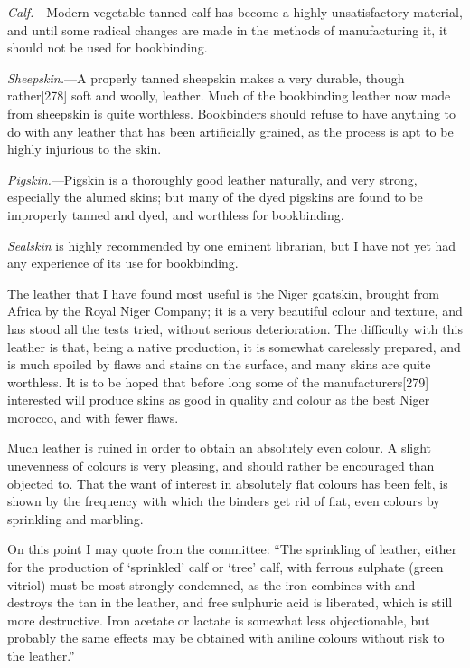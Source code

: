 \documentclass[
]{article}
\begin{document}
\emph{Calf.}---Modern vegetable-tanned calf has become a highly
unsatisfactory material, and until some radical changes are made in the
methods of manufacturing it, it should not be used for bookbinding.

\emph{Sheepskin.}---A properly tanned sheepskin makes a very durable,
though rather{\protect\hypertarget{Page_278}{}{{[}278{]}}} soft and
woolly, leather. Much of the bookbinding leather now made from sheepskin
is quite worthless. Bookbinders should refuse to have anything to do
with any leather that has been artificially grained, as the process is
apt to be highly injurious to the skin.

\emph{Pigskin.}---Pigskin is a thoroughly good leather naturally, and
very strong, especially the alumed skins; but many of the dyed pigskins
are found to be improperly tanned and dyed, and worthless for
bookbinding.

\emph{Sealskin} is highly recommended by one eminent librarian, but I
have not yet had any experience of its use for bookbinding.

The leather that I have found most useful is the Niger goatskin, brought
from Africa by the Royal Niger Company; it is a very beautiful colour
and texture, and has stood all the tests tried, without serious
deterioration. The difficulty with this leather is that, being a native
production, it is somewhat carelessly prepared, and is much spoiled by
flaws and stains on the surface, and many skins are quite worthless. It
is to be hoped that before long some of the
manufacturers{\protect\hypertarget{Page_279}{}{{[}279{]}}} interested
will produce skins as good in quality and colour as the best Niger
morocco, and with fewer flaws.

Much leather is ruined in order to obtain an absolutely even colour. A
slight unevenness of colours is very pleasing, and should rather be
encouraged than objected to. That the want of interest in absolutely
flat colours has been felt, is shown by the frequency with which the
binders get rid of flat, even colours by sprinkling and marbling.

On this point I may quote from the committee: ``The sprinkling of
leather, either for the production of `sprinkled' calf or `tree' calf,
with ferrous sulphate (green vitriol) must be most strongly condemned,
as the iron combines with and destroys the tan in the leather, and free
sulphuric acid is liberated, which is still more destructive. Iron
acetate or lactate is somewhat less objectionable, but probably the same
effects may be obtained with aniline colours without risk to the
leather.''
\end{document}
